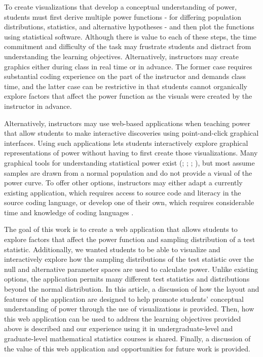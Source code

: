 \documentclass{TISE}
\begin{document}
To create visualizations that develop a conceptual understanding of power, students must first derive multiple power functions - for differing population distributions, statistics, and alternative hypotheses - and then plot the functions using statistical software. Although there is value to each of these steps, the time commitment and difficulty of the task may frustrate students and distract from understanding the learning objectives. Alternatively, instructors may create graphics either during class in real time or in advance. The former case requires substantial coding experience on the part of the instructor and demands class time, and the latter case can be restrictive in that students cannot organically explore factors that affect the power function as the visuals were created by the instructor in advance.

Alternatively, instructors may use web-based applications when teaching power that allow students to make interactive discoveries using point-and-click graphical interfaces. Using such applications lets students interactively explore graphical representations of power without having to first create those visualizations. Many graphical tools for understanding statistical power exist (\citealt{aberson2002}; \citealt{andersoncook2003}; \citealt{rossman2004}; \citealt{post2016}), but most assume samples are drawn from a normal population and do not provide a visual of the power curve. To offer other options, instructors may either adapt a currently existing application, which requires access to source code and literacy in the source coding language, or develop one of their own, which requires considerable time and knowledge of coding languages \citep{doi2016}.  

The goal of this work is to create a web application that allows students to explore factors that affect the power function and sampling distribution of a test statistic. Additionally, we wanted students to be able to visualize and interactively explore how the sampling distributions of the test statistic over the null and alternative parameter spaces are used to calculate power. Unlike existing options, the application permits many different test statistics and distributions beyond the normal distribution. In this article, a discussion of how the layout and features of the application are designed to help promote students' conceptual understanding of power through the use of visualizations is provided. Then, how this web application can be used to address the learning objectives provided above is described and our experience using it in undergraduate-level and graduate-level mathematical statistics courses is shared. Finally, a discussion of the value of this web application and opportunities for future work is provided. 
\end{document}
